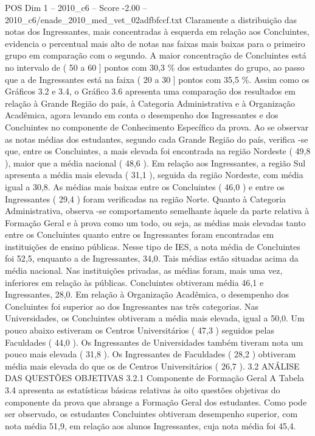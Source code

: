 \begin{textsample}{POS Dim 1 – 2010\_c6 – Score -2.00 – 2010\_c6/enade\_2010\_med\_vet\_02adfbfccf.txt}
Claramente a distribuição das notas dos Ingressantes, mais concentradas à esquerda em relação aos Concluintes, evidencia o percentual mais alto de notas nas faixas mais baixas para o primeiro grupo em comparação com o segundo.
A maior concentração de Concluintes está no intervalo de ( 50 a 60 ] pontos com 30,3 \% dos estudantes do grupo, ao passo que a de Ingressantes está na faixa ( 20 a 30 ] pontos com 35,5 \%.
Assim como os Gráficos 3.2 e 3.4, o Gráfico 3.6 apresenta uma comparação dos resultados em relação à Grande Região do país, à Categoria Administrativa e à Organização Acadêmica, agora levando em conta o desempenho dos Ingressantes e dos Concluintes no componente de Conhecimento Específico da prova.
Ao se observar as notas médias dos estudantes, segundo cada Grande Região do país, verifica -se que, entre os Concluintes, a mais elevada foi encontrada na região Nordeste ( 49,8 ), maior que a média nacional ( 48,6 ).
Em relação aos Ingressantes, a região Sul apresenta a média mais elevada ( 31,1 ), seguida da região Nordeste, com média igual a 30,8.
As médias mais baixas entre os Concluintes ( 46,0 ) e entre os Ingressantes ( 29,4 ) foram verificadas na região Norte.
Quanto à Categoria Administrativa, observa -se comportamento semelhante àquele da parte relativa à Formação Geral e à prova como um todo, ou seja, as médias mais elevadas tanto entre os Concluintes quanto entre os Ingressantes foram encontradas em instituições de ensino públicas.
Nesse tipo de IES, a nota média de Concluintes foi 52,5, enquanto a de Ingressantes, 34,0.
Tais médias estão situadas acima da média nacional.
Nas instituições privadas, as médias foram, mais uma vez, inferiores em relação às públicas.
Concluintes obtiveram média 46,1 e Ingressantes, 28,0.
Em relação à Organização Acadêmica, o desempenho dos Concluintes foi superior ao dos Ingressantes nas três categorias.
Nas Universidades, os Concluintes obtiveram a média mais elevada, igual a 50,0.
Um pouco abaixo estiveram os Centros Universitários ( 47,3 ) seguidos pelas Faculdades ( 44,0 ).
Os Ingressantes de Universidades também tiveram nota um pouco mais elevada ( 31,8 ).
Os Ingressantes de Faculdades ( 28,2 ) obtiveram média mais elevada do que os de Centros Universitários ( 26,7 ). 3.2 ANÁLISE DAS QUESTÕES OBJETIVAS 3.2.1 Componente de Formação Geral A Tabela 3.4 apresenta as estatísticas básicas relativas às oito questões objetivas do componente da prova que abrange a Formação Geral dos estudantes.
Como pode ser observado, os estudantes Concluintes obtiveram desempenho superior, com nota média 51,9, em relação aos alunos Ingressantes, cuja nota média foi 45,4.

\end{textsample}

